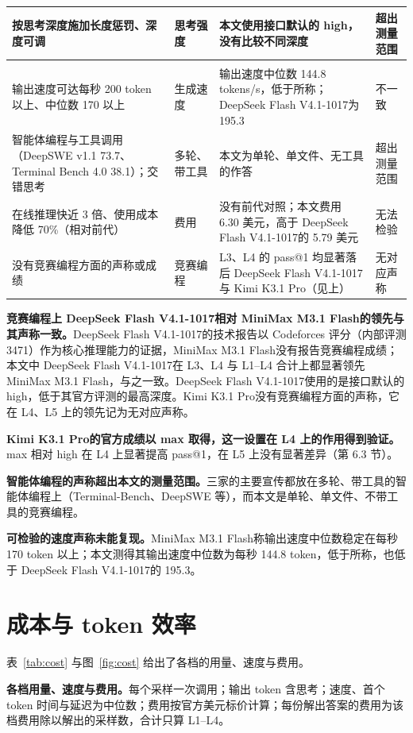 \documentclass[11pt,a4paper,fontset=none]{ctexart}
\newcommand{\kimi}{Kimi K3.1 Pro}
\newcommand{\mini}{MiniMax M3.1 Flash}
\newcommand{\ds}{DeepSeek Flash V4.1-1017}
\newcommand{\lead}[1]{\textbf{#1}\quad}
\begin{document}
{\begin{longtable}{@{}>{\raggedright\arraybackslash}p{4.0cm}>{\raggedright\arraybackslash}p{1.6cm}>{\raggedright\arraybackslash}p{6.9cm}>{\raggedright\arraybackslash}p{2.2cm}@{}}
    按思考深度施加长度惩罚、深度可调 & 思考强度 & 本文使用接口默认的 high，没有比较不同深度 & 超出测量范围 \\
    \midrule
    \multicolumn{4}{@{}l}{\textbf{\mini}} \\
    输出速度可达每秒 200 token 以上、中位数 170 以上 & 生成速度 & 输出速度中位数 144.8 tokens/s，低于所称；\ds 为 195.3 & 不一致 \\
    智能体编程与工具调用（DeepSWE v1.1 73.7、Terminal Bench 4.0 38.1）；交错思考 & 多轮、带工具 & 本文为单轮、单文件、无工具的作答 & 超出测量范围 \\
    在线推理快近 3 倍、使用成本降低 70\%（相对前代） & 费用 & 没有前代对照；本文费用 6.30 美元，高于 \ds 的 5.79 美元 & 无法检验 \\
    没有竞赛编程方面的声称或成绩 & 竞赛编程 & L3、L4 的 pass@1 均显著落后 \ds 与 \kimi（见上） & 无对应声称 \\
    \bottomrule
\end{longtable}
}

\lead{竞赛编程上 \ds 相对 \mini 的领先与其声称一致。}\ds 的技术报告以 Codeforces 评分（内部评测 3471）作为核心推理能力的证据，\mini 没有报告竞赛编程成绩；本文中 \ds 在 L3、L4 与 L1--L4 合计上都显著领先 \mini，与之一致。\ds 使用的是接口默认的 high，低于其官方评测的最高深度。\kimi 没有竞赛编程方面的声称，它在 L4、L5 上的领先记为无对应声称。

\lead{\kimi 的官方成绩以 max 取得，这一设置在 L4 上的作用得到验证。}max 相对 high 在 L4 上显著提高 pass@1，在 L5 上没有显著差异（第 6.3 节）。

\lead{智能体编程的声称超出本文的测量范围。}三家的主要宣传都放在多轮、带工具的智能体编程上（Terminal-Bench、DeepSWE 等），而本文是单轮、单文件、不带工具的竞赛编程。

\lead{可检验的速度声称未能复现。}\mini 称输出速度中位数稳定在每秒 170 token 以上；本文测得其输出速度中位数为每秒 144.8 token，低于所称，也低于 \ds 的 195.3。

\section{成本与 token 效率}

表~\ref{tab:cost} 与图~\ref{fig:cost} 给出了各档的用量、速度与费用。

\begin{table}[H]
  \centering
  \caption{\textbf{各档用量、速度与费用。}每个采样一次调用；输出 token 含思考；速度、首个 token 时间与延迟为中位数；费用按官方美元标价计算；每份解出答案的费用为该档费用除以解出的采样数，合计只算 L1--L4。}
  \label{tab:cost}
  \small
  \begin{adjustbox}{max width=\linewidth}\end{adjustbox}
\end{table}
\end{document}

